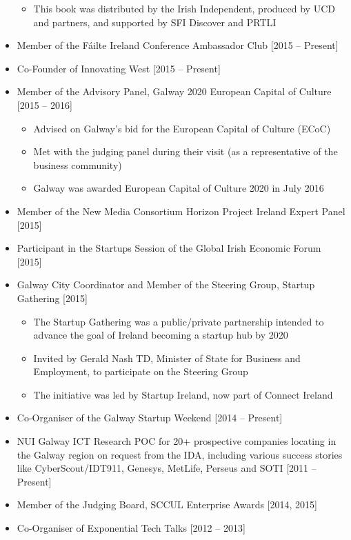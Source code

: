 \documentclass[10pt,a4paper]{res} %
\begin{document}
\begin{resume}
\begin{itemize}
\begin{itemize} \itemsep -2pt
\item This book was distributed by the Irish Independent, produced by UCD and partners, and supported by SFI Discover and PRTLI
\end{itemize}
\item Member of the F\'{a}ilte Ireland Conference Ambassador Club [2015 -- Present]
\item Co-Founder of Innovating West [2015 -- Present]
\item Member of the Advisory Panel, Galway 2020 European Capital of Culture [2015 -- 2016]
\begin{itemize} \itemsep -2pt
\item Advised on Galway's bid for the European Capital of Culture (ECoC)
\item Met with the judging panel during their visit (as a representative of the business community)
\item Galway was awarded European Capital of Culture 2020 in July 2016
\end{itemize}
\item Member of the New Media Consortium Horizon Project Ireland Expert Panel [2015]
\item Participant in the Startups Session of the Global Irish Economic Forum [2015]
\item Galway City Coordinator and Member of the Steering Group, Startup Gathering [2015]
\begin{itemize} \itemsep -2pt
\item The Startup Gathering was a public/private partnership intended to advance the goal of Ireland becoming a startup hub by 2020
\item Invited by Gerald Nash TD, Minister of State for Business and Employment, to participate on the Steering Group
\item The initiative was led by Startup Ireland, now part of Connect Ireland
\end{itemize}
\item Co-Organiser of the Galway Startup Weekend [2014 -- Present]
\item NUI Galway ICT Research POC for 20+ prospective companies locating in the Galway region on request from the IDA, including various success stories like CyberScout/IDT911, Genesys, MetLife, Perseus and SOTI [2011 -- Present]
\item Member of the Judging Board, SCCUL Enterprise Awards [2014, 2015]
\item Co-Organiser of Exponential Tech Talks [2012 -- 2013]

\end{itemize}
\end{resume}
\end{document}
